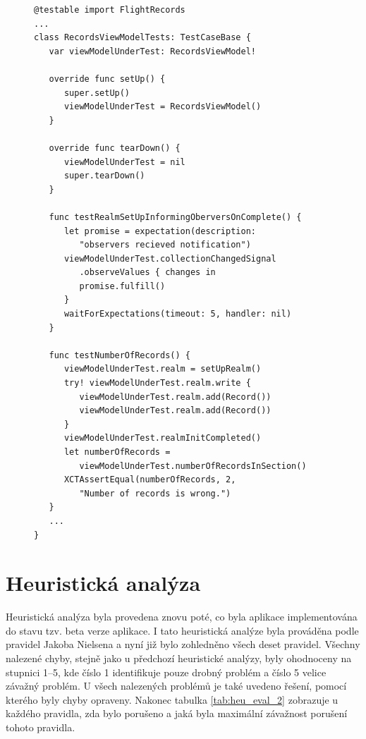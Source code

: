 \documentclass[thesis=M,czech]{FITthesis}[2012/06/26]
\begin{document}
\begin{figure}
\begin{minipage}{\linewidth}
\begin{lstlisting}[caption={Ukázka unit testů},label={lst:unitTests}]
@testable import FlightRecords
...
class RecordsViewModelTests: TestCaseBase {
   var viewModelUnderTest: RecordsViewModel!
    
   override func setUp() {
      super.setUp()
      viewModelUnderTest = RecordsViewModel()
   }
    
   override func tearDown() {
      viewModelUnderTest = nil
      super.tearDown()
   }

   func testRealmSetUpInformingOberversOnComplete() {
      let promise = expectation(description: 
         "observers recieved notification") 
      viewModelUnderTest.collectionChangedSignal
         .observeValues { changes in
         promise.fulfill()
      } 
      waitForExpectations(timeout: 5, handler: nil)
   }

   func testNumberOfRecords() {
      viewModelUnderTest.realm = setUpRealm()
      try! viewModelUnderTest.realm.write {
         viewModelUnderTest.realm.add(Record())
         viewModelUnderTest.realm.add(Record())
      }
      viewModelUnderTest.realmInitCompleted() 
      let numberOfRecords = 
         viewModelUnderTest.numberOfRecordsInSection()  
      XCTAssertEqual(numberOfRecords, 2, 
         "Number of records is wrong.")
   }
   ...
}
\end{lstlisting}
\end{minipage}
\end{figure}
	
\section{Heuristická analýza}
Heuristická analýza byla provedena znovu poté, co byla aplikace implementována do stavu tzv. beta verze aplikace. I tato heuristická analýze byla prováděna podle pravidel Jakoba Nielsena a nyní již bylo zohledněno všech deset pravidel. Všechny nalezené chyby, stejně jako u předchozí heuristické analýzy, byly ohodnoceny na stupnici 1--5, kde číslo 1 identifikuje pouze drobný problém a číslo 5 velice závažný problém. U všech nalezených problémů je také uvedeno řešení, pomocí kterého byly chyby opraveny. Nakonec tabulka \ref{tab:heu_eval_2} zobrazuje u každého pravidla, zda bylo porušeno a jaká byla maximální závažnost porušení tohoto pravidla.
\end{document}
